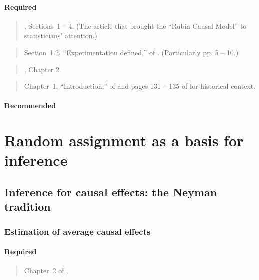 \documentclass[12pt]{article}
\begin{document}
\paragraph*{Required}

\begin{verse}, Sections~1 -- 4. (The article that brought the ``Rubin Causal Model'' to  statisticians' attention.)\end{verse}

\begin{verse} Section~1.2, ``Experimentation defined,''  of
.  (Particularly pp. 5 -- 10.) \end{verse}

\begin{verse} , Chapter 2. \end{verse}

\begin{verse} Chapter~1, ``Introduction,'' of  and pages 131 -- 135 of  for historical context. \end{verse}

\paragraph*{Recommended}

\begin{verse}  \end{verse}

\section{Random assignment as a basis for inference}

\subsection{Inference for causal effects: the Neyman tradition}

\subsubsection{Estimation of average causal effects}

\paragraph*{Required}

\begin{verse}
  Chapter~2 of .
\end{verse}
\end{document}
